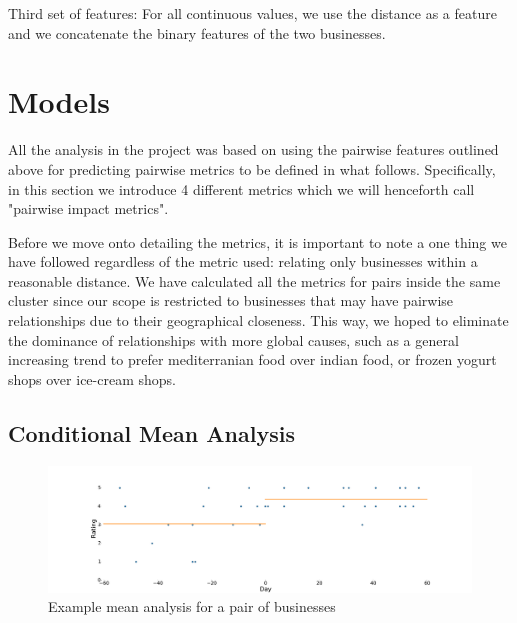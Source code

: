 \documentclass{vldb}
\begin{document}
Third set of features: For all continuous values, we use the distance as a feature and we concatenate the binary features of the two businesses.


\section{Models}
All the analysis in the project was based on using the pairwise features outlined above for predicting pairwise metrics to be defined in what follows.
Specifically, in this section we introduce 4 different metrics which we will henceforth call "pairwise impact metrics".

Before we move onto detailing the metrics, it is important to note a one thing we have followed regardless of the metric used: relating only businesses within a reasonable distance. We have calculated all the metrics for pairs inside the same cluster since our scope is restricted to businesses that may have pairwise relationships due to their geographical closeness. This way, we hoped to eliminate the dominance of relationships with more global causes, such as a general increasing trend to prefer mediterranian food over indian food, or frozen yogurt shops over ice-cream shops. 


\subsection*{Conditional Mean Analysis}

\begin{figure}[h]
\centering
\includegraphics[width=\columnwidth]{mean.pdf}
\caption{Example mean analysis for a pair of businesses}
\end{figure}
\end{document}
